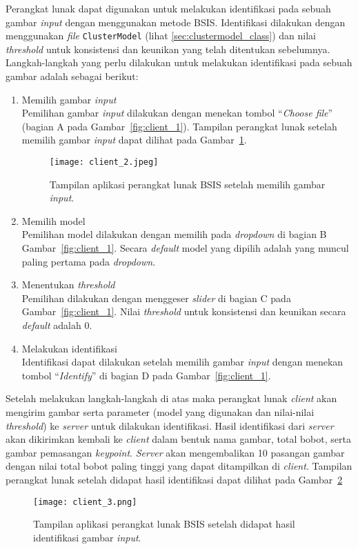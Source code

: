 Perangkat lunak dapat digunakan untuk melakukan identifikasi pada sebuah gambar \textit{input} dengan menggunakan metode BSIS. Identifikasi dilakukan dengan menggunakan \textit{file} \texttt{ClusterModel} (lihat  \ref{sec:clustermodel_class}) dan nilai \textit{threshold} untuk konsistensi dan keunikan yang telah ditentukan sebelumnya. Langkah-langkah yang perlu dilakukan untuk melakukan identifikasi pada sebuah gambar adalah sebagai berikut:
\begin{enumerate}
	\item Memilih gambar \textit{input} \\
	Pemilihan gambar \textit{input} dilakukan dengan menekan tombol ``\textit{Choose file}'' (bagian A pada Gambar~\ref{fig:client_1}). Tampilan perangkat lunak setelah memilih gambar \textit{input} dapat dilihat pada Gambar~\ref{fig:client_2}.
	\begin{figure}[H]
		\centering
		\texttt{[image: client\_2.jpeg]}
		\caption{Tampilan aplikasi perangkat lunak BSIS setelah memilih gambar \textit{input}.}
		\label{fig:client_2}
	\end{figure} 
	\newpage
	\item Memilih model \\
	Pemilihan model dilakukan dengan memilih pada \textit{dropdown} di bagian B Gambar~\ref{fig:client_1}. Secara \textit{default} model yang dipilih adalah yang muncul paling pertama pada \textit{dropdown}.
	\item Menentukan \textit{threshold} \\
	Pemilihan dilakukan dengan menggeser \textit{slider} di bagian C pada Gambar~\ref{fig:client_1}. Nilai \textit{threshold} untuk konsistensi dan keunikan secara \textit{default} adalah 0.
	\item Melakukan identifikasi \\
	Identifikasi dapat dilakukan setelah memilih gambar \textit{input} dengan menekan tombol ``\textit{Identify}'' di bagian D pada Gambar~\ref{fig:client_1}.
\end{enumerate}

Setelah melakukan langkah-langkah di atas maka perangkat lunak \textit{client} akan mengirim gambar serta parameter (model yang digunakan dan nilai-nilai \textit{threshold}) ke \textit{server} untuk dilakukan identifikasi. Hasil identifikasi dari \textit{server} akan dikirimkan kembali ke \textit{client} dalam bentuk nama gambar, total bobot, serta gambar pemasangan \textit{keypoint}. \textit{Server} akan mengembalikan 10 pasangan gambar dengan nilai total bobot paling tinggi yang dapat ditampilkan di \textit{client}. Tampilan perangkat lunak setelah didapat hasil identifikasi dapat dilihat pada Gambar~\ref{fig:client_3}
\begin{figure}[H]
	\centering
	\texttt{[image: client\_3.png]}
	\caption{Tampilan aplikasi perangkat lunak BSIS setelah didapat hasil identifikasi gambar \textit{input}.}
	\label{fig:client_3}
\end{figure}

